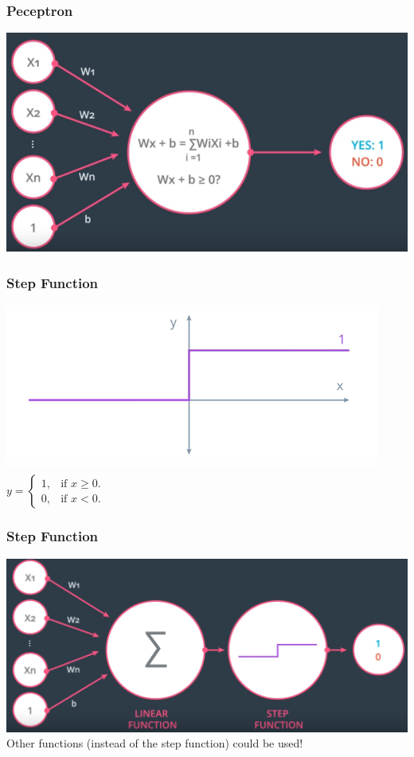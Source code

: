 \begin{frame}[fragile]
  \frametitle{Peceptron}
  \includegraphics[scale=0.3]{img/perceptron}
\end{frame}

\begin{frame}[fragile]
  \frametitle{Step Function}
  \includegraphics[scale=0.3]{img/stepfunction}\\
  \vspace{3mm}
  $
  y=\begin{cases}
    1, & \text{if $x \geq 0$}.\\
    0, & \text{if $x < 0$}.
  \end{cases}
  $
\end{frame}

\begin{frame}[fragile]
  \frametitle{Step Function}
  \includegraphics[scale=0.25]{img/perceptron_step}\\
  \vspace{3mm}
  Other functions (instead of the step function) could be used!
\end{frame}

